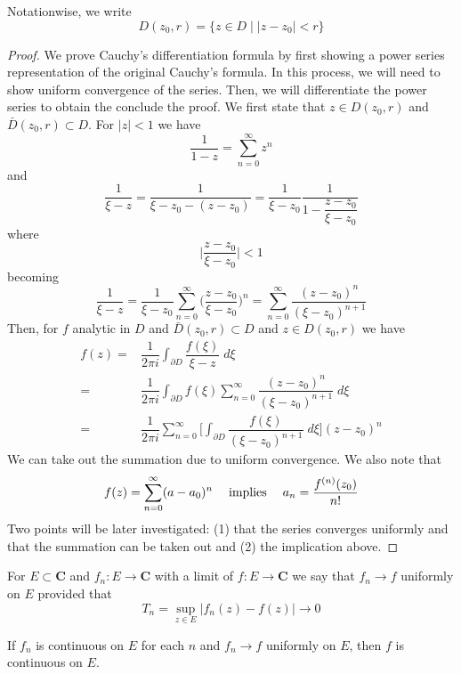 \vspace{2ex}
\begin{rmk}
Notationwise, we write 
\[D(z_0,r)=\{z\in D\;|\;|z-z_0|<r\}\]
\end{rmk}
\vspace{2ex}
\begin{proof}
We prove Cauchy's differentiation formula by first showing a power series representation of the original Cauchy's formula. In this process, we will need to show uniform convergence of the series. Then, we will differentiate the power series to obtain the conclude the proof. We first state that $z\in D(z_0,r) $ and $\bar{D}(z_0,r)\subset D$. For $|z|<1$ we have 
\[\dfrac{1}{1-z}=\sum ^{\infty }_{n=0}z^{n}\]
and 
\[\dfrac{1}{\xi -z}=\dfrac{1}{\xi -z_0-(z-z_0)}=\dfrac{1}{\xi -z_0}\dfrac{1}{1-\dfrac{z-z_0}{\xi -z_0}}\]
where
\[\Big|\dfrac{z-z_0}{\xi -z_0}\Big|<1\]
becoming
\[\dfrac{1}{\xi -z}=\dfrac{1}{\xi -z_0}\sum ^{\infty }_{n=0}\Big(\dfrac{z-z_0}{\xi -z_0}\Big)^{n}=\sum ^{\infty }_{n=0}\dfrac{(z-z_0)^{n}}{(\xi -z_0)^{n+1}}\]
Then, for $f$ analytic in $D$ and $\bar{D}(z_0,r)\subset D$ and $z\in D(z_0,r)$ we have
\begin{align*}
f(z)=&\dfrac{1}{2\pi i}\int _{\partial D}\dfrac{f(\xi )}{\xi -z}\;d\xi \\
=&\dfrac{1}{2\pi i}\int _{\partial D}f(\xi )\sum ^{\infty }_{n=0}\dfrac{(z-z_0)^{n}}{(\xi -z_0)^{n+1}}\;d\xi \\
=&\dfrac{1}{2\pi i}\sum ^{\infty }_{n=0}\Big[\int _{\partial D}\dfrac{f(\xi )}{(\xi -z_0)^{n+1}}\;d\xi \Big](z-z_0)^{n}
\end{align*}
We can take out the summation due to uniform convergence. We also note that
\[f(z)=\sum ^{\infty }_{n=0}(a-a_0)^{n}\hspace{3ex}\mathrm{implies}\hspace{3ex}a_{n}=\dfrac{f^{(n)}(z_0)}{n!}\]
Two points will be later investigated: (1) that the series converges uniformly and that the summation can be taken out and (2) the implication above. 
\end{proof}
\vspace{2ex}
\begin{defi}
For $E\subset {\bm C}$ and $f_{n}:E\rightarrow  {\bm C}$ with a limit of $f:E\rightarrow {\bm C}$ we say that $f_{n}\rightarrow f$ uniformly on $E$ provided that
\[T_{n}=\sup_{z\in E}|f_{n}(z)-f(z)|\rightarrow 0\]
\end{defi}
\vspace{2ex}
\begin{thm}
If $f_{n}$ is continuous on $E$ for each $n$ and $f_{n}\rightarrow f$ uniformly on $E$, then $f$ is continuous on $E$.
\end{thm}
